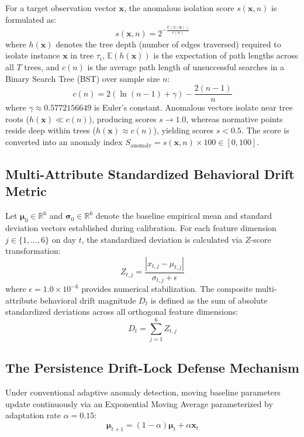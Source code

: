 \documentclass[conference]{IEEEtran}
\begin{document}
For a target observation vector $\mathbf{x}$, the anomalous isolation score $s(\mathbf{x}, n)$ is formulated as:
\begin{equation}
s(\mathbf{x}, n) = 2^{-\frac{\mathbb{E}(h(\mathbf{x}))}{c(n)}}
\label{eq:iforest_score}
\end{equation}
where $h(\mathbf{x})$ denotes the tree depth (number of edges traversed) required to isolate instance $\mathbf{x}$ in tree $\tau_i$, $\mathbb{E}(h(\mathbf{x}))$ is the expectation of path lengths across all $T$ trees, and $c(n)$ is the average path length of unsuccessful searches in a Binary Search Tree (BST) over sample size $n$:
\begin{equation}
c(n) = 2\left(\ln(n - 1) + \gamma\right) - \frac{2(n - 1)}{n}
\end{equation}
where $\gamma \approx 0.5772156649$ is Euler's constant. Anomalous vectors isolate near tree roots ($h(\mathbf{x}) \ll c(n)$), producing scores $s \to 1.0$, whereas normative points reside deep within trees ($h(\mathbf{x}) \approx c(n)$), yielding scores $s < 0.5$. The score is converted into an anomaly index $S_{\text{anomaly}} = s(\mathbf{x}, n) \times 100 \in [0, 100]$.

\subsection{Multi-Attribute Standardized Behavioral Drift Metric}
Let $\boldsymbol{\mu}_0 \in \mathbb{R}^6$ and $\boldsymbol{\sigma}_0 \in \mathbb{R}^6$ denote the baseline empirical mean and standard deviation vectors established during calibration. For each feature dimension $j \in \{1, \dots, 6\}$ on day $t$, the standardized deviation is calculated via $Z$-score transformation:
\begin{equation}
Z_{t, j} = \frac{|x_{t, j} - \mu_{t, j}|}{\sigma_{t, j} + \epsilon}
\end{equation}
where $\epsilon = 1.0 \times 10^{-6}$ provides numerical stabilization. The composite multi-attribute behavioral drift magnitude $D_t$ is defined as the sum of absolute standardized deviations across all orthogonal feature dimensions:
\begin{equation}
D_t = \sum_{j=1}^{6} Z_{t, j}
\label{eq:drift_metric}
\end{equation}

\subsection{The Persistence Drift-Lock Defense Mechanism}
Under conventional adaptive anomaly detection, moving baseline parameters update continuously via an Exponential Moving Average parameterized by adaptation rate $\alpha = 0.15$:
\begin{equation}
\boldsymbol{\mu}_{t+1} = (1 - \alpha)\boldsymbol{\mu}_t + \alpha \mathbf{x}_t
\end{equation}
\end{document}
